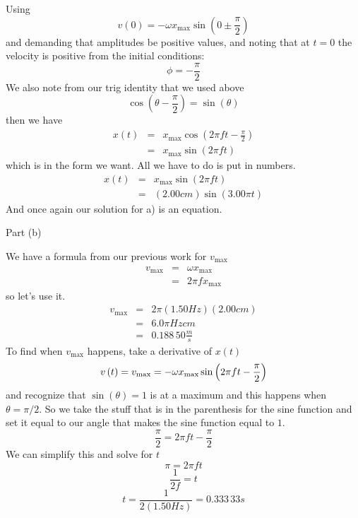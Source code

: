 \documentclass{book}
\begin{document}
Using%
\begin{equation*}
v\left( 0\right) =-\omega x_{\max }\sin \left( 0\pm \frac{\pi }{2}\right)
\end{equation*}%
and demanding that amplitudes be positive values, and noting that at $t=0$
the velocity is positive from the initial conditions:%
\begin{equation*}
\phi =-\frac{\pi }{2}
\end{equation*}%
We also note from our trig identity that we used above%
\begin{equation*}
\cos \left( \theta -\frac{\pi }{2}\right) =\sin \left( \theta \right)
\end{equation*}%
then we have%
\begin{eqnarray*}
x\left( t\right) &=&x_{\max }\cos \left( 2\pi ft-\frac{\pi }{2}\right) \\
&=&x_{\max }\sin \left( 2\pi ft\right)
\end{eqnarray*}%
which is in the form we want. All we have to do is put in numbers. 
\begin{eqnarray*}
x\left( t\right) &=&x_{\max }\sin \left( 2\pi ft\right) \\
&=&\left( 2.00\unit{cm}\right) \sin \left( 3.00\pi t\right)
\end{eqnarray*}%
And once again our solution for a) is an equation.

Part (b)

We have a formula from our previous work for $v_{\max }$ 
\begin{eqnarray*}
v_{\max } &=&\omega x_{\max } \\
&=&2\pi fx_{\max }
\end{eqnarray*}%
so let's use it. 
\begin{eqnarray*}
v_{\max } &=&2\pi \left( 1.50\unit{Hz}\right) \left( 2.00\unit{cm}\right) \\
&=&\allowbreak 6.0\pi \unit{Hz}\unit{cm} \\
&=&\allowbreak 0.188\,50\frac{\unit{m}}{\unit{s}}
\end{eqnarray*}%
To find when $v_{\max }$ happens, take a derivative of $x\left( t\right) $%
\begin{equation*}
v\left( t\right) =v_{\max }=-\omega x_{\max }\sin \left( 2\pi ft-\frac{\pi }{%
2}\right)
\end{equation*}%
and recognize that $\sin \left( \theta \right) =1$ is at a maximum and this
happens when $\theta =\pi /2$. So we take the stuff that is in the
parenthesis for the sine function and set it equal to our angle that makes
the sine function equal to $1$.%
\begin{equation*}
\frac{\pi }{2}=2\pi ft-\frac{\pi }{2}
\end{equation*}%
We can simplify this and solve for $t$%
\begin{equation*}
\pi =2\pi ft
\end{equation*}%
\begin{equation*}
\frac{1}{2f}=t
\end{equation*}%
\begin{equation*}
t=\frac{1}{2\left( 1.50\unit{Hz}\right) }=0.333\,33\unit{s}
\end{equation*}
\end{document}
